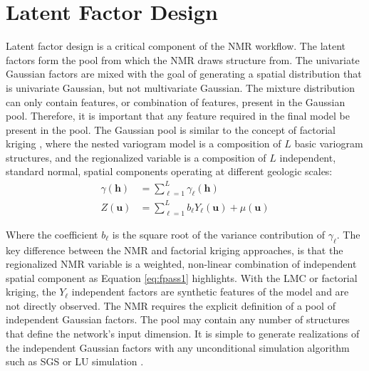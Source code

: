 \FloatBarrier
\section{Latent Factor Design}
\label{sec:04factord}

Latent factor design is a critical component of the \gls{NMR} workflow. The latent factors form the pool from which the \gls{NMR} draws structure from. The univariate Gaussian factors are mixed with the goal of generating a spatial distribution that is univariate Gaussian, but not multivariate Gaussian. The mixture distribution can only contain features, or combination of features, present in the Gaussian pool. Therefore, it is important that any feature required in the final model be present in the pool. The Gaussian pool is similar to the concept of factorial kriging \citep{goovaerts1997geostatistics}, where the nested variogram model is a composition of $L$ basic variogram structures, and the regionalized variable is a composition of $L$ independent, standard normal, spatial components operating at different geologic scales:
\begin{align}
    \label{eq:gamma_comp}
    \gamma(\mathbf{h}) & = \sum_{\ell=1}^{L} \gamma_{\ell}(\mathbf{h})                     \\
    \label{eq:z_comp}
    Z(\mathbf{u})      & = \sum_{\ell=1}^{L}b_{\ell}Y_{\ell}(\mathbf{u}) + \mu(\mathbf{u})
\end{align}

Where the coefficient $b_{\ell}$ is the square root of the variance contribution of $\gamma_{\ell}$. The key difference between the \gls{NMR} and factorial kriging approaches, is that the regionalized \gls{NMR} variable is a weighted, non-linear combination of independent spatial component as Equation \ref{eq:fpass1} highlights. With the \gls{LMC} or factorial kriging, the $Y_{\ell}$ independent factors are synthetic features of the model and are not directly observed. The \gls{NMR} requires the explicit definition of a pool of independent Gaussian factors. The pool may contain any number of structures that define the network's input dimension. It is simple to generate realizations of the independent Gaussian factors with any unconditional simulation algorithm such as \gls{SGS} \citep{gomez-hernandez1993joint} or LU simulation \citep{davis1987production}.

